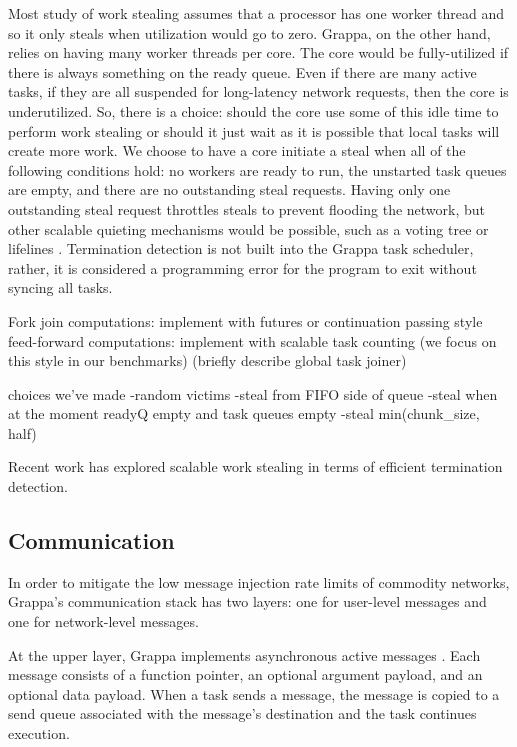 Most study of work stealing assumes that a processor has one worker
thread and so it only steals when utilization would go to zero. 
Grappa, on the other hand, relies on having many worker threads per core. The
core would be fully-utilized if there is always something on the ready
queue. Even if there are many active tasks, if they are all suspended
for long-latency network requests, then the core is underutilized.
So, there is a choice: should the core use some of this idle time to
perform work stealing or should it just wait as it is possible that local tasks will
create more work. We choose to have a core initiate a steal when all
of the following conditions hold: no workers are ready to run, 
the unstarted task queues are empty, and there are no outstanding steal requests. 
Having only one outstanding steal request throttles steals to
prevent flooding the network, but other scalable quieting mechanisms
would be possible, such as a voting tree\cite{scalableWorkStealingOrCilk98}
or lifelines \cite{lifelines}. Termination detection is not
built into the Grappa task scheduler, rather, it is considered a programming error for
the program to exit without syncing all tasks.

Fork join computations: implement with futures or continuation passing
style
feed-forward computations: implement with scalable task counting (we
focus on this style in our benchmarks)
(briefly describe global task joiner)

choices we've made
-random victims
-steal from FIFO side of queue
-steal when at the moment readyQ empty and task queues empty
-steal min(chunk\_size, half)

Recent work has explored scalable work stealing in terms of efficient
termination detection. 



\subsection{Communication}

In order to mitigate the low message injection rate limits of commodity
networks, Grappa's communication stack has two layers: one for
user-level messages and one for network-level messages. 

At the upper layer, Grappa implements asynchronous active messages
. Each message consists of a function pointer, an
optional argument payload, and an optional data payload. When a task
sends a message, the message is copied to a send queue associated with
the message's destination and the task continues execution.

